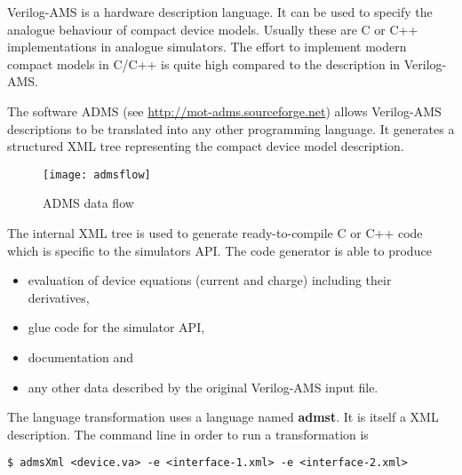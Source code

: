 %
%
%
%


Verilog-AMS is a hardware description language.  It can be used to
specify the analogue behaviour of compact device models.  Usually
these are C or C++ implementations in analogue simulators.  The effort
to implement modern compact models in C/C++ is quite high compared to
the description in Verilog-AMS.


The software ADMS (see \url{http://mot-adms.sourceforge.net}) allows
Verilog-AMS descriptions to be translated into any other programming
language.  It generates a structured XML tree representing the compact
device model description.

\begin{figure}[ht]
\begin{center}
\texttt{[image: admsflow]}
\end{center}
\caption{ADMS data flow}
\label{fig:admsflow}
\end{figure}
\FloatBarrier

The internal XML tree is used to generate ready-to-compile C or C++
code which is specific to the simulators API.  The code generator is
able to produce
\begin{itemize}
\item evaluation of device equations (current and charge) including
their derivatives,
\item glue code for the simulator API,
\item documentation and
\item any other data described by the original Verilog-AMS input file.
\end{itemize}


The language transformation uses a language named \textbf{admst}.  It
is itself a XML description.  The command line in order to run a
transformation is
\begin{Verbatim}[fontsize=\small]
  $ admsXml <device.va> -e <interface-1.xml> -e <interface-2.xml>
\end{Verbatim}

